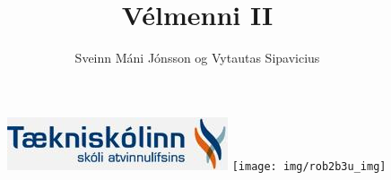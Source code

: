 \documentclass{article}
\begin{document}
\title{Vélmenni II}
\author{Sveinn Máni Jónsson og Vytautas Sipavicius}
\maketitle
\begin{figure}[h]
\centering
\includegraphics[scale=.65]{img/tskoli}
\texttt{[image: img/rob2b3u\_img]}
\end{figure}
\newpage
\tableofcontents
\newpage



\newpage



\newpage



\newpage

\end{document}

